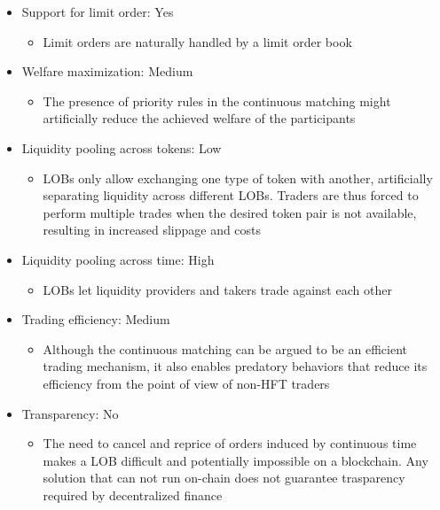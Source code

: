 \documentclass[11pt, reqno]{amsart}
\theoremstyle{definition}
\theoremstyle{remark}
\begin{document}
\begin{itemize}
	\item Support for limit order: Yes
	      \begin{itemize}
		      \item Limit orders are naturally handled by a limit order book
	      \end{itemize}
	\item Welfare maximization: Medium
	      \begin{itemize}
		      \item The presence of priority rules in the continuous matching
                might artificially reduce the achieved welfare of the participants
	      \end{itemize}
	\item Liquidity pooling across tokens: Low
	      \begin{itemize}
		      \item LOBs only allow exchanging one type of token with another,
                artificially separating liquidity across different LOBs. 
                Traders are thus forced to perform multiple trades when the
                desired token pair is not available, resulting in increased
                slippage and costs
	      \end{itemize}
	\item Liquidity pooling across time: High
	      \begin{itemize}
		      \item LOBs let liquidity providers and takers trade against each other
	      \end{itemize}
	\item Trading efficiency: Medium
	      \begin{itemize}
              \item Although the continuous matching can be argued to be an efficient
                trading mechanism, it also enables predatory behaviors that reduce
                its efficiency from the point of view of non-HFT traders
	      \end{itemize}
	\item Transparency: No
	      \begin{itemize}
		      \item The need to cancel and reprice of orders induced by continuous
                time makes a LOB difficult and potentially impossible on a blockchain.
                Any solution that can not run on-chain does not guarantee trasparency
                required by decentralized finance

\end{itemize}
\end{itemize}
\end{document}
